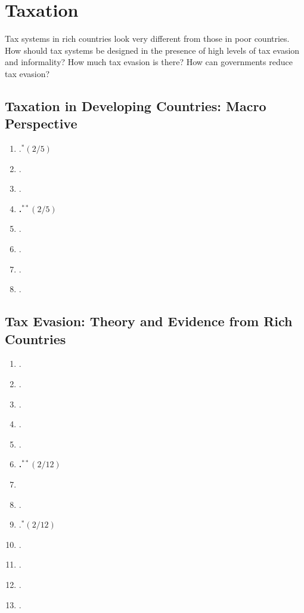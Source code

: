 \documentclass[11pt]{article}
\begin{document}
\section{Taxation}
Tax systems in rich countries look very different from those in poor countries. How should tax systems be designed in the presence of high levels of tax evasion and informality? How much tax evasion is there? How can governments reduce tax evasion?

\subsection{Taxation in Developing Countries: Macro Perspective}

\begin{enumerate}
\item {}.$^{*}(2/5)$
\item {}.
\item {}.
\item \textbf{.$^{**}(2/5)$}
\item {}.
\item {}.
\item {}.
\item {}.
\end{enumerate}

\subsection{Tax Evasion: Theory and Evidence from Rich Countries}

\begin{enumerate}
\item {}.
\item {}.
\item {}.
\item {}.
\item {}.
\item \textbf{.$^{**}(2/12)$}
\item {}
\item {}.
\item {}.$^{*}(2/12)$
\item {}.
\item {}.
\item {}.
\item {}.
\end{enumerate}
\end{document}
